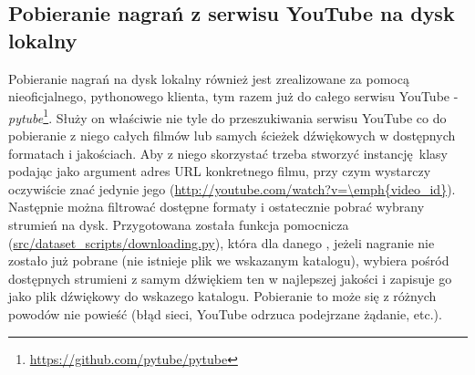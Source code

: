 \subsection{Pobieranie nagrań z serwisu YouTube na dysk lokalny}
Pobieranie nagrań na dysk lokalny również jest zrealizowane za pomocą nieoficjalnego, pythonowego klienta, tym razem już do całego serwisu YouTube - \emph{pytube}\footnote{\url{https://github.com/pytube/pytube}}. Służy on właściwie nie tyle do przeszukiwania serwisu YouTube co do pobieranie z niego całych filmów lub samych ścieżek dźwiękowych w dostępnych formatach i jakościach. Aby z niego skorzystać trzeba stworzyć instancję klasy  podając jako argument adres URL konkretnego filmu, przy czym wystarczy oczywiście znać jedynie jego  (\url{http://youtube.com/watch?v=\emph{video_id}}). Następnie można filtrować dostępne formaty i ostatecznie pobrać wybrany strumień na dysk. Przygotowana została funkcja pomocnicza (\url{src/dataset_scripts/downloading.py}), która dla danego , jeżeli nagranie nie zostało już pobrane (nie istnieje plik we wskazanym katalogu), wybiera pośród dostępnych strumieni z samym dźwiękiem ten w najlepszej jakości i zapisuje go jako plik dźwiękowy do wskazego katalogu. Pobieranie to może się z różnych powodów nie powieść (błąd sieci, YouTube odrzuca podejrzane żądanie, etc.).

